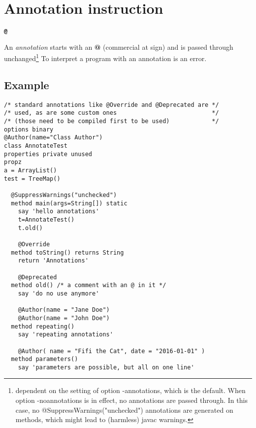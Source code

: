 \chapter{Annotation instruction}\label{refparse}
\begin{shaded}
\begin{alltt}
\textbf{@}
\end{alltt}
\end{shaded}
An \emph{annotation} starts with an \textbf{@} (commercial at sign)
and is passed through unchanged\footnote{dependent on the setting of
option -annotations, which is the default. When option -noannotations
is in effect, no annotations are passed through. In this case, no
@SuppressWarnings("unchecked") annotations are generated on methods,
which might lead to (harmless) javac warnings. } To interpret a program with an annotation is an error.
\section{Example}
\begin{lstlisting}
/* standard annotations like @Override and @Deprecated are */
/* used, as are some custom ones                           */
/* (those need to be compiled first to be used)            */
options binary
@Author(name="Class Author")
class AnnotateTest
properties private unused
propz
a = ArrayList()
test = TreeMap()

  @SuppressWarnings("unchecked")
  method main(args=String[]) static
    say 'hello annotations'
    t=AnnotateTest()
    t.old()

    @Override
  method toString() returns String
    return 'Annotations'

    @Deprecated
  method old() /* a comment with an @ in it */
    say 'do no use anymore'

    @Author(name = "Jane Doe")
    @Author(name = "John Doe")
  method repeating()
    say 'repeating annotations'

    @Author( name = "Fifi the Cat", date = "2016-01-01" )
  method parameters()
    say 'parameters are possible, but all on one line'
\end{lstlisting}
